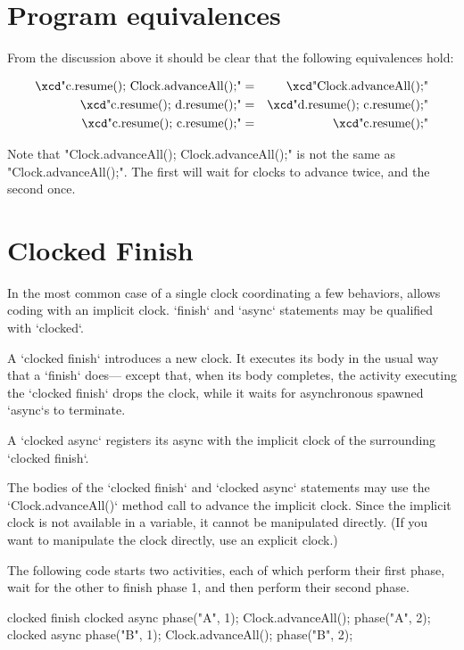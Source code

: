 \section{Program equivalences}
From the discussion above it should be clear that the following
equivalences hold:

{\small
\begin{eqnarray}
 \mbox{\xcd"c.resume(); Clock.advanceAll();"}       &=& \mbox{\xcd"Clock.advanceAll();"}\\
 \mbox{\xcd"c.resume(); d.resume();"} &=& \mbox{\xcd"d.resume(); c.resume();"}\\
 \mbox{\xcd"c.resume(); c.resume();"} &=& \mbox{\xcd"c.resume();"}
\end{eqnarray}
}

Note that \xcd"Clock.advanceAll(); Clock.advanceAll();" is not the same as \xcd"Clock.advanceAll();". The
first will wait for clocks to advance twice, and the second
once.  


\section{Clocked Finish}
\label{ClockedFinish}

In the most common case of a single clock coordinating a few behaviors, \Xten{}
allows coding with an implicit clock.  \xcd`finish` and \xcd`async` statements
may be qualified with \xcd`clocked`.  

A \xcd`clocked finish` introduces a new clock.  It executes its body in the
usual way that a \xcd`finish` does--- except that, when its body completes,
the activity executing the \xcd`clocked finish` drops the clock, while it
waits for asynchronous spawned \xcd`async`s to terminate.  

A \xcd`clocked async` registers its async with the implicit clock of
the surrounding \xcd`clocked finish`.   

The bodies of the \xcd`clocked finish` and \xcd`clocked async`
statements  may use the
\xcd`Clock.advanceAll()` 
method call to advance the implicit clock.  Since the implicit clock is not
available in a variable, it cannot be manipulated directly. (If you want to
manipulate the clock directly, use an explicit clock.)

\begin{ex}
The following code starts two activities, each of which perform their first
phase, wait for the other to finish phase 1, and then perform their second
phase.  
\begin{xten}
clocked finish {
  clocked async {
     phase("A", 1);
     Clock.advanceAll();
     phase("A", 2);
  }
  clocked async {
     phase("B", 1);
     Clock.advanceAll();
     phase("B", 2);
  }
}
\end{xten}
\end{ex}

